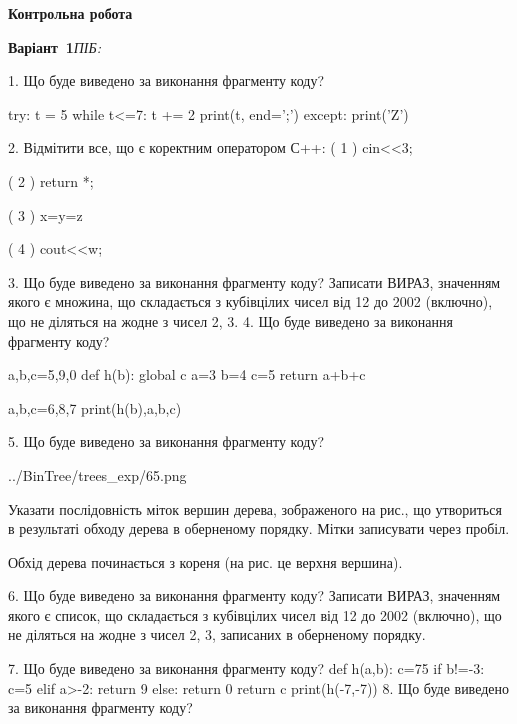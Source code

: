 \documentclass[11pt]{article}
\begin{document}
{\large\textbf{Контрольна робота}}

\textbf{Варіант \No\,1}\hfill \textit{ПІБ:}\,\underline{\hspace{60mm}}
\vspace{4mm}

1. Що буде виведено за виконання фрагменту коду?

try:
    t = 5
    while t<=7:
        t += 2
    print(t, end=';')
except:
    print('Z')


2. %
Відмітити все, що є коректним оператором С++:
( 1 ) cin<<3;

( 2 ) return *;

( 3 ) x=y=z

( 4 ) cout<<w;

3. Що буде виведено за виконання фрагменту коду?
Записати ВИРАЗ, значенням якого є множина, що складається з кубівцілих чисел від 12 до 2002 (включно), що не діляться на жодне з чисел 2, 3.
4. Що буде виведено за виконання фрагменту коду?

a,b,c=5,9,0
def h(b):
global c    a=3
    b=4
    c=5
    return a+b+c

a,b,c=6,8,7
print(h(b),a,b,c)

5. Що буде виведено за виконання фрагменту коду?

\begin{center}
	{../BinTree/trees_exp/65.png}
\end{center}
Указати послідовність міток вершин дерева, зображеного на рис., що утвориться в результаті обходу дерева в оберненому порядку. Мітки записувати через пробіл.\par Обхід дерева починається з кореня (на рис. це верхня вершина).

6. Що буде виведено за виконання фрагменту коду?
Записати ВИРАЗ, значенням якого є список, що складається з кубівцілих чисел від 12 до 2002 (включно), що не діляться на жодне з чисел 2, 3, записаних в обернено\-му порядку.

7. Що буде виведено за виконання фрагменту коду?
def h(a,b):
      c=75
      if b!=-3: c=5
      elif a>-2: return 9
      else: return 0
      return c
   print(h(-7,-7))
8. Що буде виведено за виконання фрагменту коду?
\end{document}
